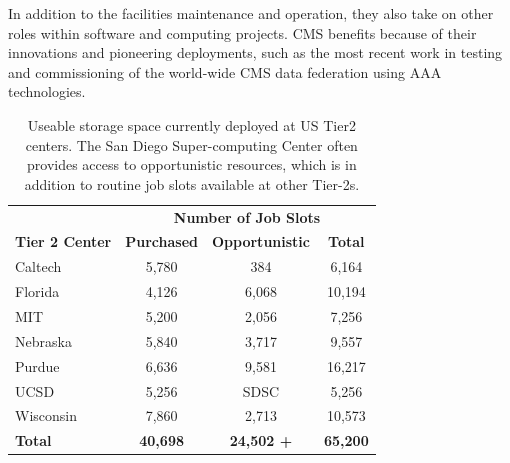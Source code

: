 \documentclass[11pt,a4paper]{article}
\begin{document}
In addition to the facilities maintenance and operation, they also take 
on other roles within software and computing projects.  CMS benefits
because of their innovations and pioneering deployments, such as
the most recent work in testing and commissioning of the world-wide
CMS data federation using AAA technologies.

\begin{table}
\begin{center}
\begin{tabular}{|l|c|c|c|}
\hline
& \multicolumn{3}{|c|}{\bf Number of Job Slots} \\ \cline{2-4}
{\bf Tier 2 Center}                         & {\bf Purchased} & {\bf Opportunistic} & {\bf Total} \\ \hline
Caltech                                         & 5,780 &    384 &   6,164 \\
Florida                                          & 4,126 & 6,068 & 10,194 \\
MIT                                               & 5,200 & 2,056 &   7,256 \\
Nebraska                                      & 5,840 & 3,717 &   9,557 \\
Purdue                                          & 6,636 & 9,581 & 16,217 \\
UCSD                                           & 5,256 & SDSC &  5,256 \\ 
Wisconsin                                     & 7,860 & 2,713  & 10,573 \\ \hline
{\bf Total}                                       & {\bf 40,698} & {\bf 24,502 +} & {\bf 65,200} \\ \hline
\end{tabular}
\caption[]
{
Useable storage space currently deployed at US Tier2 centers.
The San Diego Super-computing Center often provides access
to opportunistic resources, which is in addition to routine 
job slots available at other Tier-2s.
}
\label{compute-resources}
\end{center}
\end{table}
\end{document}
